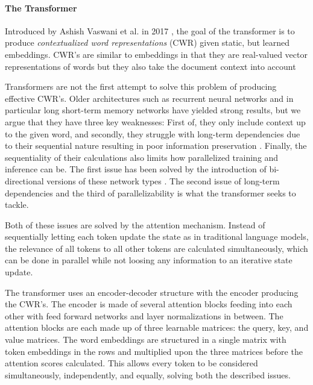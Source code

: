 \documentclass[main.tex]{subfiles}
\begin{document}
\paragraph{The Transformer}
Introduced by Ashish Vaswani et al. in 2017 \cite{vaswani2017att}, the goal of the transformer is to produce \emph{contextualized word representations} (CWR) given static, but learned embeddings.
CWR's are similar to embeddings in that they are real-valued vector representations of words but they also take the document context into account

Transformers are not the first attempt to solve this problem of producing effective CWR's.
Older architectures such as recurrent neural networks \cite[Ch. 10]{Goodfellow-et-al-2016} and in particular long short-term memory networks \cite{hochreiter1997lstm} have yielded strong results, but we argue that they have three key weaknesses:
First of, they only include context up to the given word, and secondly, they struggle with long-term dependencies due to their sequential nature resulting in poor information preservation \cite{Goodfellow-et-al-2016}.
Finally, the sequentiality of their calculations also limits how parallelized training and inference can be.
The first issue has been solved by the introduction of bi-directional versions of these network types \cite{schuster1997birnn}.
The second issue of long-term dependencies and the third of parallelizability is what the transformer seeks to tackle.

Both of these issues are solved by the attention mechanism.
Instead of sequentially letting each token update the state as in traditional language models, the relevance of all tokens to all other tokens are calculated simultaneously, which can be done in parallel while not loosing any information to an iterative state update.

The transformer uses an encoder-decoder structure with the encoder producing the CWR's.
The encoder is made of several attention blocks feeding into each other with feed forward networks and layer normalizations in between.
The attention blocks are each made up of three learnable matrices: the query, key, and value matrices.
The word embeddings are structured in a single matrix with token embeddings in the rows and multiplied upon the three matrices before the attention scores calculated.
This allows every token to be considered simultaneously, independently, and equally, solving both the described issues.
\cite{vaswani2017att}
\end{document}
